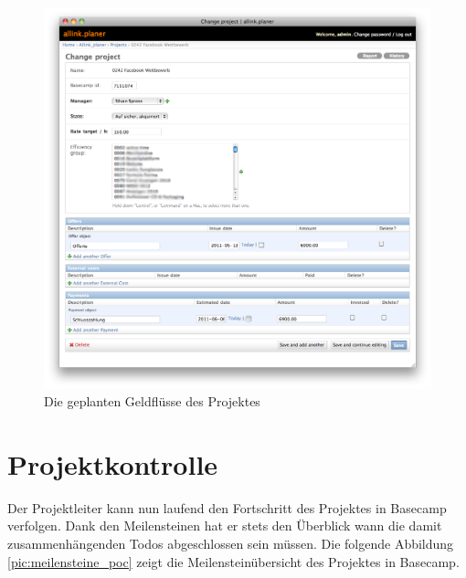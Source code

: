 \begin{figure}[htbp]
\begin{center}
\includegraphics[width=1.0\textwidth,angle=0]{./bilder/proof_of_concept/geldfluessse_poc.png}
\caption[Die geplanten Geldflüsse des Projektes]{Die geplanten Geldflüsse des Projektes\footnotemark}
\label{pic:geldfluessse_poc}
\end{center}
\end{figure}

\clearpage

\section{Projektkontrolle}
Der Projektleiter kann nun laufend den Fortschritt des Projektes in Basecamp
verfolgen. Dank den Meilensteinen hat er stets den Überblick wann die damit
zusammenhängenden Todos abgeschlossen sein müssen. Die folgende Abbildung
\ref{pic:meilensteine_poc} zeigt die Meilensteinübersicht des Projektes in Basecamp.

